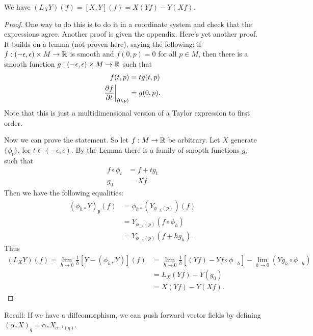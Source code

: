 \documentclass[11pt, english]{article}
\begin{document}
\begin{thm}
We have $(L_XY)(f) = [X,Y](f) = X(Yf)-Y(Xf)$.
\end{thm}
\begin{proof}
 One way to do this is to do it in a coordinate system and check that the expressions agree. Another proof is given the appendix. Here's yet another proof. It builds on a lemma (not proven here), saying the following: if $f:(-\epsilon, \epsilon) \times M \to \mathbb{R}$ is smooth and $f(0,p)=0$ for all $p \in M$, then there is a smooth function $g:(-\epsilon,\epsilon) \times M \to \mathbb{R}$ such that
\begin{align*}
f(t,p) &= tg(t,p) \\
\restr{\dd{f}{t}}{(0,p)}&= g(0,p).
\end{align*}
Note that this is just a multidimensional version of a Taylor expression to first order. 

Now we can prove the statement. So let $f:M \to \mathbb{R}$ be arbitrary. Let $X$ generate $\{ \phi_t \}$, for $t \in (-\epsilon,\epsilon)$. By the Lemma there is a family of smooth functions $g_t$ such that
\begin{align}
  f \circ \phi_t &= f + t g_t \\
g_0 &= Xf.
\end{align}
Then we have the following equalities:
\begin{align*}
  (\phi_{h \ast}Y)_p(f) &= \phi_{h \ast}(Y_{\phi_{-h}(p)})(f) \\
&= Y_{\phi_{-h}(p)}(f \circ \phi_h) \\
&= Y_{\phi_{-h}(p)}(f+ hg_h).
\end{align*}
Thus
\begin{align*}
(L_XY)(f) =  \lim_{h \to 0} \frac 1h  \left[ Y - (\phi_{h \ast}Y) \right](f) &= \lim_{h \to 0}\frac 1h  \left[ (Yf)-Yf \circ \phi_{-h} \right] -\lim_{h\to 0}(Yg_h \circ \phi_{-h}) \\
&= L_X(Yf) -Y(g_0) \\
&= X(Yf) - Y(Xf). 
\end{align*}
\end{proof}

Recall: If we have a diffeomorphism, we can push forward vector fields by defining $(\alpha_\ast X)_q = \alpha_\ast X_{\alpha^{-1}(q)}$.
\end{document}
